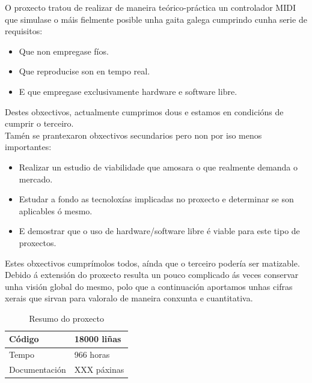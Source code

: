  O proxecto tratou de realizar de maneira teórico-práctica un controlador MIDI
 que simulase o máis fielmente posible unha gaita galega cumprindo cunha serie
 de requisitos:
 
 \begin{itemize}
  \item Que non empregase fíos.
  \item Que reproducise son en tempo real.
  \item E que empregase exclusivamente hardware e software libre.
 \end{itemize}
 
 
 Destes obxectivos, actualmente cumprimos dous e estamos en condicións de
 cumprir o terceiro. \\
 
 Tamén se prantexaron obxectivos secundarios pero non por iso menos importantes:
 
 \begin{itemize}
  \item Realizar un estudio de viabilidade que amosara o que realmente demanda o
    mercado.
  \item Estudar a fondo as tecnoloxías implicadas no proxecto e determinar se
    son aplicables ó mesmo.
  \item E demostrar que o uso de hardware/software libre é viable para este tipo
    de proxectos.
 \end{itemize}
 
 
 Estes obxectivos cumprímolos todos, aínda que o terceiro podería ser
 matizable. \\
 
 Debido á extensión do proxecto resulta un pouco complicado ás veces conservar
 unha visión global do mesmo, polo que a continuación aportamos unhas cifras
 xerais que sirvan para valoralo de maneira conxunta e cuantitativa. \\
 
 \begin{table}[htbp]
  \centering
  \begin{tabular}{|l|l|}
   \hline
   Código & 18000 liñas \\
   \hline
   Tempo & 966 horas \\
   \hline
   Documentación & XXX páxinas \\ %
   \hline
  \end{tabular}
  \caption{Resumo do proxecto}
  \label{tabla:ResumoProxecto}
 \end{table}
 
